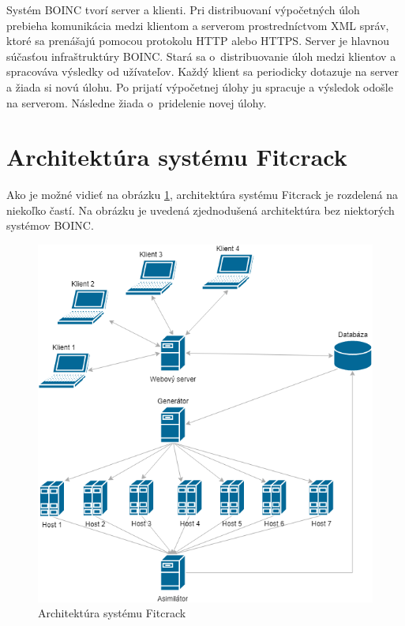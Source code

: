 \documentclass[slovak]{fitthesis}
\begin{document}
Systém BOINC tvorí server a klienti. Pri distribuovaní výpočetných úloh prebieha komunikácia medzi klientom a serverom prostredníctvom XML správ, ktoré sa prenášajú pomocou protokolu HTTP alebo HTTPS.
Server je hlavnou súčasťou infraštruktúry BOINC. Stará sa o~distribuovanie úloh medzi klientov a spracováva výsledky od užívateľov.
Každý klient sa periodicky dotazuje na server a žiada si novú úlohu. Po prijatí výpočetnej úlohy ju spracuje a výsledok odošle na serverom. Následne žiada o~pridelenie novej úlohy.\cite{boinccitace}


\section{Architektúra systému Fitcrack}
Ako je možné vidieť na obrázku \ref{fig:archFitcrack}, architektúra systému Fitcrack je rozdelená na niekoľko častí. Na obrázku je uvedená zjednodušená architektúra bez niektorých systémov BOINC.

\begin{figure}[h]
    \centering
    \includegraphics[scale=0.7]{obrazky/FitcrackSystem.png}
    \caption{Architektúra systému Fitcrack}
    \label{fig:archFitcrack}
\end{figure}
\end{document}
